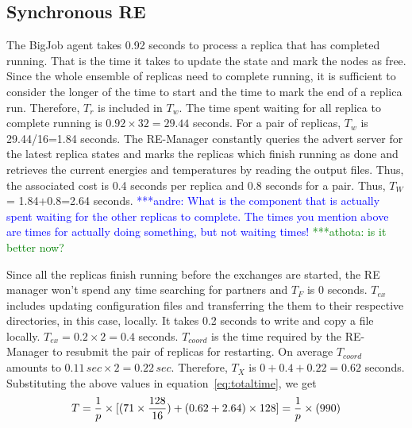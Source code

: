 \documentclass{rspublic}
\newcommand{\alnote}[1]{ {\textcolor{blue} { ***andre: #1 }}}
\newcommand{\athotanote}[1]{ {\textcolor{green} { ***athota: #1 }}}
\newcommand{\alnote}[1]{}
\newcommand{\athotanote}[1]{}
\begin{document}
\subsection{Synchronous RE}
\label{sec:impl_sync_re}

The BigJob agent takes 0.92 seconds to process a replica that
has completed running.  That is the time it takes to update the state and
mark the nodes as free. Since the whole ensemble of replicas need to complete running, it is
sufficient to consider the longer of the time to start and the time to
mark the end of a replica run. Therefore, $T_r$ is included in $T_w$. The time spent waiting for all replica to complete running is $0.92\times32=29.44$ seconds. For a pair of replicas, $T_w$ is 29.44/16=1.84 seconds. The RE-Manager constantly queries
the advert server for the latest replica states and marks the replicas
which finish running as done and retrieves the current energies and
temperatures by reading the output files. Thus, the associated cost is 0.4 seconds per
replica and 0.8 seconds for a pair. Thus, $T_W$ = 1.84+0.8=2.64 seconds.  \alnote{What is the component that
  is actually spent waiting for the other replicas to complete. The
  times you mention above are times for actually doing something, but
  not waiting times!} \athotanote{is it better now?}

Since all the replicas finish running before the exchanges are
started, the RE manager won't spend any time searching for partners
and $T_F$ is 0 seconds. $T_{ex}$ includes updating configuration files
and transferring the them to their respective directories, in this
case, locally. It takes 0.2 seconds to write and copy a file
locally. $T_{ex} = 0.2 \times 2=0.4$ seconds. $T_{coord}$ is the time
required by the RE-Manager to resubmit the pair of replicas for restarting. On average $T_{coord}$ amounts to $0.11\,sec \times 2 =
0.22\,sec$. Therefore, $T_{X}$ is $0+0.4+0.22=0.62$ seconds.
Substituting the above values in equation~\ref{eq:totaltime}, we get
\begin{eqnarray}
  T=  {1 \over p} \times {[ {(71\times {128\over 16}})+ (0.62 + 2.64)\times 128]} = {1 \over p} \times (990)
\label{eq:sync}
\end{eqnarray}
\end{document}
